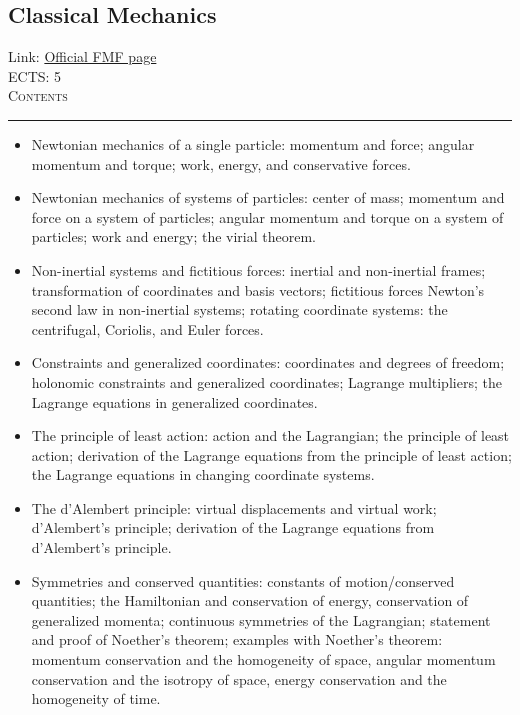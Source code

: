 \documentclass[11pt, a4paper]{article}
\newenvironment{course}[3]{
\subsection{#1}%
Link: \href{#2}{Official FMF page}\\%
ECTS: #3%
\vspace{1ex}
\\
{\large \textsc{Contents}}\\[-0.9ex]%
\rule{\textwidth}{0.5pt}
\vspace{-3ex}
}
{}
\newenvironment{chapter}[1]{
\begin{tcolorbox}[title=#1, breakable]
}
{\end{tcolorbox}}
\begin{document}
\begin{course}{Classical Mechanics}{https://www.fmf.uni-lj.si/en/study-physics/programmes/1fiz/2020/7000777/courses/1155/}{5}
    \label{classical-mechanics}

    \begin{chapter}{Review of Newtonian mechanics}
        \begin{itemize}
        
            \item Newtonian mechanics of a single particle: momentum and force; angular momentum and torque; work, energy, and conservative forces.

            \item Newtonian mechanics of systems of particles: center of mass; momentum and force on a system of particles; angular momentum and torque on a system of particles; work and energy; the virial theorem.

            \item Non-inertial systems and fictitious forces: inertial and non-inertial frames; transformation of coordinates and basis vectors; fictitious forces Newton's second law in non-inertial systems; rotating coordinate systems: the centrifugal, Coriolis, and Euler forces.
        
        \end{itemize}
    \end{chapter}

    \begin{chapter}{Lagrangian mechanics}
        \begin{itemize}
        
            \item Constraints and generalized coordinates: coordinates and degrees of freedom; holonomic constraints and generalized coordinates; Lagrange multipliers; the Lagrange equations in generalized coordinates.

            \item The principle of least action: action and the Lagrangian; the principle of least action; derivation of the Lagrange equations from the principle of least action; the Lagrange equations in changing coordinate systems.

            \item The d'Alembert principle: virtual displacements and virtual work; d'Alembert's principle; derivation of the Lagrange equations from d'Alembert's principle.

            \item Symmetries and conserved quantities: constants of motion/conserved quantities; the Hamiltonian and conservation of energy, conservation of generalized momenta; continuous symmetries of the Lagrangian; statement and proof of Noether's theorem; examples with Noether's theorem: momentum conservation and the homogeneity of space, angular momentum conservation and the isotropy of space, energy conservation and the homogeneity of time.


\end{itemize}
\end{chapter}
\end{course}
\end{document}

